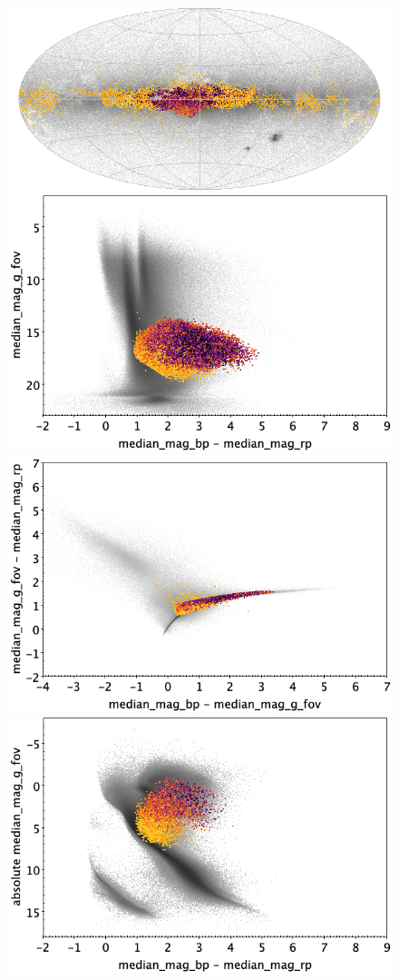 \documentclass[longauth]{aa}
\begin{document}
\begin{appendix}
\begin{figure}
\centering
{}
\includegraphics[width=0.6\hsize]{figures/appendix/ELL_cls_sky.png} 
 \\ %
\vspace{4mm}
 \includegraphics[width=0.45\hsize]{figures/appendix/ELL_cls_cm.png}  %
\hspace{2mm}
 \includegraphics[width=0.45\hsize]{figures/appendix/ELL_cls_cc.png} \\ %
\vspace{4mm}
 \includegraphics[width=0.45\hsize]{figures/appendix/ELL_cls_cam.png}  %

\end{figure}
\end{appendix}
\end{document}
